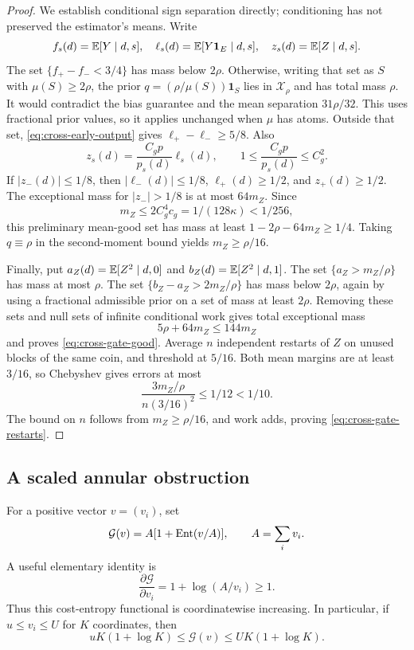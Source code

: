 \begin{proof}
We establish conditional sign separation directly; conditioning has
not preserved the estimator's means.  Write
\[
 f_s(d)=\mathbb E[Y\mid d,s],\quad
 \ell_s(d)=\mathbb E[Y\mathbf 1_E\mid d,s],\quad
 z_s(d)=\mathbb E[Z\mid d,s].
\]
The set \(\{f_+-f_-<3/4\}\) has mass below \(2\rho\).
Otherwise, writing that set as $S$ with $\mu(S)\ge2\rho$, the
prior $q=(\rho/\mu(S))\mathbf1_S$ lies in $\mathcal X_\rho$ and has total
mass $\rho$. It would contradict the bias guarantee and the mean
separation $31\rho/32$. This uses fractional prior values, so it applies
unchanged when $\mu$ has atoms.
Outside that set, \eqref{eq:cross-early-output} gives
\(\ell_+-\ell_-\ge5/8\).
Also
\[
 z_s(d)=\frac{C_gp}{p_s(d)}\ell_s(d),\qquad
 1\le\frac{C_gp}{p_s(d)}\le C_g^2.
\]
If \(|z_-(d)|\le1/8\), then \(|\ell_-(d)|\le1/8\),
\(\ell_+(d)\ge1/2\), and \(z_+(d)\ge1/2\).
The exceptional mass for \(|z_-|>1/8\) is at most \(64m_Z\).
Since
\[
 m_Z\le2C_g^4c_g=1/(128\kappa)<1/256,
\]
this preliminary mean-good set has mass at least
\(1-2\rho-64m_Z\ge1/4\).
Taking \(q\equiv\rho\) in the second-moment bound yields
\(m_Z\ge\rho/16\).

Finally, put \(a_Z(d)=\mathbb E[Z^2\mid d,0]\) and
\(b_Z(d)=\mathbb E[Z^2\mid d,1]\).
The set \(\{a_Z>m_Z/\rho\}\) has mass at most \(\rho\).
The set \(\{b_Z-a_Z>2m_Z/\rho\}\) has mass below \(2\rho\),
again by using a fractional admissible prior on a set of mass
at least \(2\rho\).  Removing these sets and null sets of infinite
conditional work gives total exceptional mass
\[
 5\rho+64m_Z\le144m_Z
\]
and proves \eqref{eq:cross-gate-good}.
Average \(n\) independent restarts of \(Z\) on unused blocks of the
same coin, and threshold at \(5/16\).
Both mean margins are at least \(3/16\), so Chebyshev gives errors
at most
\[
 \frac{3m_Z/\rho}{n(3/16)^2}\le1/12<1/10.
\]
The bound on \(n\) follows from \(m_Z\ge\rho/16\), and work adds,
proving \eqref{eq:cross-gate-restarts}.
\end{proof}

\subsection{A scaled annular obstruction}

For a positive vector \(v=(v_i)\), set
\[
 \mathcal G(v)=A[1+\operatorname{Ent}(v/A)],\qquad A=\sum_i v_i.
\]
A useful elementary identity is
\begin{equation}
 \frac{\partial\mathcal G}{\partial v_i}
 =1+\log(A/v_i)\ge1.
 \label{eq:cross-entropy-monotone}
\end{equation}
Thus this cost-entropy functional is coordinatewise increasing.
In particular, if \(u\le v_i\le U\) for \(K\) coordinates, then
\begin{equation}
 uK(1+\log K)\le\mathcal G(v)\le UK(1+\log K).
 \label{eq:cross-entropy-sandwich}
\end{equation}

